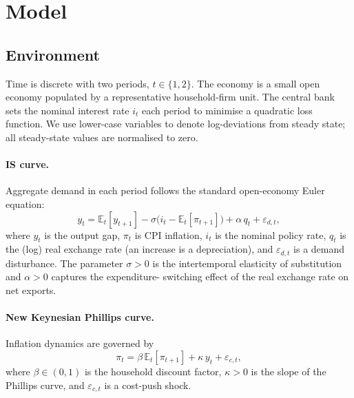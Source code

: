 
\section{Model}
\label{sec:model}

\subsection{Environment}
\label{sec:environment}

Time is discrete with two periods, $t \in \{1,2\}$. The economy is a small open
economy populated by a representative household-firm unit. The central bank sets the
nominal interest rate $i_t$ each period to minimise a quadratic loss function. We use
lower-case variables to denote log-deviations from steady state; all steady-state
values are normalised to zero.

\paragraph{IS curve.}
Aggregate demand in each period follows the standard open-economy Euler equation:
\begin{equation}
  y_t = \mathbb{E}_t[y_{t+1}] - \sigma\bigl(i_t - \mathbb{E}_t[\pi_{t+1}]\bigr)
        + \alpha\, q_t + \varepsilon_{d,t},
  \label{eq:IS}
\end{equation}
where $y_t$ is the output gap, $\pi_t$ is CPI inflation, $i_t$ is the nominal policy
rate, $q_t$ is the (log) real exchange rate (an increase is a depreciation), and
$\varepsilon_{d,t}$ is a demand disturbance. The parameter $\sigma > 0$ is the
intertemporal elasticity of substitution and $\alpha > 0$ captures the expenditure-
switching effect of the real exchange rate on net exports.

\paragraph{New Keynesian Phillips curve.}
Inflation dynamics are governed by
\begin{equation}
  \pi_t = \beta\, \mathbb{E}_t[\pi_{t+1}] + \kappa\, y_t + \varepsilon_{c,t},
  \label{eq:NKPC}
\end{equation}
where $\beta \in (0,1)$ is the household discount factor, $\kappa > 0$ is the slope
of the Phillips curve, and $\varepsilon_{c,t}$ is a cost-push shock.

